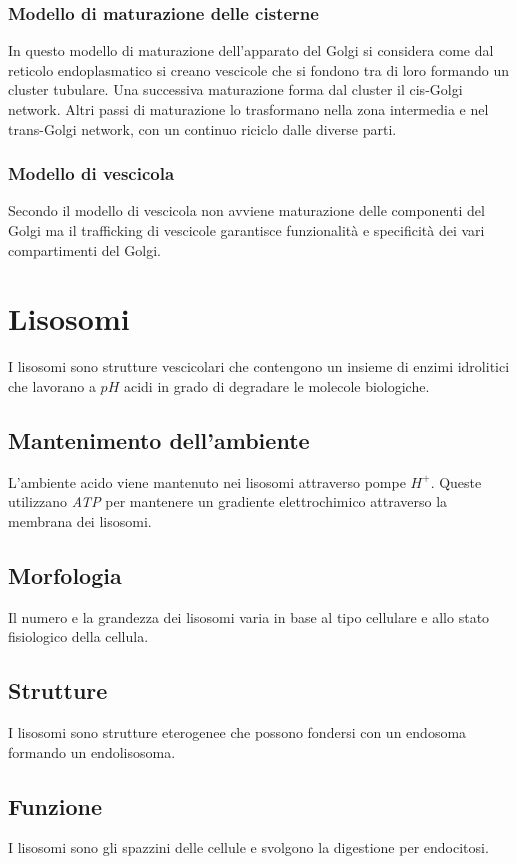 		\subsubsection{Modello di maturazione delle cisterne}
		In questo modello di maturazione dell'apparato del Golgi si considera come dal reticolo endoplasmatico si creano vescicole che si fondono tra di loro formando un cluster tubulare.
		Una successiva maturazione forma dal cluster il cis-Golgi network.
		Altri passi di maturazione lo trasformano nella zona intermedia e nel trans-Golgi network, con un continuo riciclo dalle diverse parti.

		\subsubsection{Modello di vescicola}
		Secondo il modello di vescicola non avviene maturazione delle componenti del Golgi ma il trafficking di vescicole garantisce funzionalit\`a e specificit\`a dei vari compartimenti del Golgi.

\section{Lisosomi}
I lisosomi sono strutture vescicolari che contengono un insieme di enzimi idrolitici che lavorano a $pH$ acidi in grado di degradare le molecole biologiche.

	\subsection{Mantenimento dell'ambiente}
	L'ambiente acido viene mantenuto nei lisosomi attraverso pompe \emph{$H^+$}.
	Queste utilizzano \emph{ATP} per mantenere un gradiente elettrochimico attraverso la membrana dei lisosomi.

	\subsection{Morfologia}
	Il numero e la grandezza dei lisosomi varia in base al tipo cellulare e allo stato fisiologico della cellula.

	\subsection{Strutture}
	I lisosomi sono strutture eterogenee che possono fondersi con un endosoma formando un endolisosoma.

	\subsection{Funzione}
	I lisosomi sono gli spazzini delle cellule e svolgono la digestione per endocitosi.

